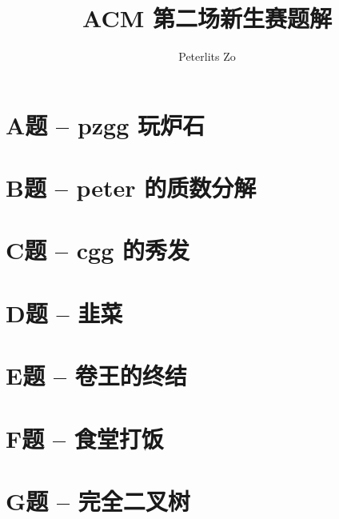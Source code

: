 \documentclass{math}
\title{ACM 第二场新生赛题解}
\author{Peterlits Zo}
\begin{document}
\maketitle
\tableofcontents

\section{A题 -- pzgg 玩炉石}


\section{B题 -- peter 的质数分解}


\section{C题 -- cgg 的秀发}


\section{D题 -- 韭菜}


\section{E题 -- 卷王的终结}


\section{F题 -- 食堂打饭}


\section{G题 -- 完全二叉树}


\end{document}
